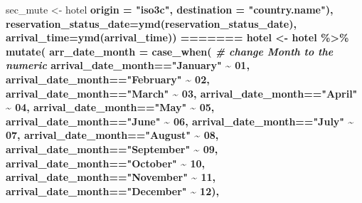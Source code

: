 \documentclass[11pt,a4paper,]{article}
\newenvironment{Shaded}{\begin{snugshade}}{\end{snugshade}}
\newcommand{\CommentTok}[1]{\textcolor[rgb]{0.56,0.35,0.01}{\textit{#1}}}
\newcommand{\DataTypeTok}[1]{\textcolor[rgb]{0.13,0.29,0.53}{#1}}
\newcommand{\DecValTok}[1]{\textcolor[rgb]{0.00,0.00,0.81}{#1}}
\newcommand{\KeywordTok}[1]{\textcolor[rgb]{0.13,0.29,0.53}{\textbf{#1}}}
\newcommand{\NormalTok}[1]{#1}
\newcommand{\OperatorTok}[1]{\textcolor[rgb]{0.81,0.36,0.00}{\textbf{#1}}}
\newcommand{\StringTok}[1]{\textcolor[rgb]{0.31,0.60,0.02}{#1}}
\begin{document}
\begin{Shaded}
\begin{Highlighting}[]
{\NormalTok{  sec_mute <-}\StringTok{ }\NormalTok{hotel }\OperatorTok{%
                                      \DataTypeTok{origin =} \StringTok{"iso3c"}\NormalTok{,}
                                      \DataTypeTok{destination =} \StringTok{"country.name"}\NormalTok{),}
          \DataTypeTok{reservation_status_date=}\KeywordTok{ymd}\NormalTok{(reservation_status_date),}
         \DataTypeTok{arrival_time=}\KeywordTok{ymd}\NormalTok{(arrival_time)) }
=======
\NormalTok{hotel \textless{}{-}}\StringTok{ }\NormalTok{hotel }\OperatorTok{\%\textgreater{}\%}\StringTok{ }\KeywordTok{mutate}\NormalTok{(}
    \DataTypeTok{arr\_date\_month =} \KeywordTok{case\_when}\NormalTok{(   }\CommentTok{\# change Month to the numeric }
\NormalTok{    arrival\_date\_month}\OperatorTok{==}\StringTok{"January"} \OperatorTok{\textasciitilde{}}\StringTok{ }\DecValTok{01}\NormalTok{,}
\NormalTok{    arrival\_date\_month}\OperatorTok{==}\StringTok{"February"} \OperatorTok{\textasciitilde{}}\StringTok{ }\DecValTok{02}\NormalTok{,}
\NormalTok{    arrival\_date\_month}\OperatorTok{==}\StringTok{"March"} \OperatorTok{\textasciitilde{}}\StringTok{ }\DecValTok{03}\NormalTok{,}
\NormalTok{    arrival\_date\_month}\OperatorTok{==}\StringTok{"April"} \OperatorTok{\textasciitilde{}}\StringTok{ }\DecValTok{04}\NormalTok{,}
\NormalTok{    arrival\_date\_month}\OperatorTok{==}\StringTok{"May"} \OperatorTok{\textasciitilde{}}\StringTok{ }\DecValTok{05}\NormalTok{,}
\NormalTok{    arrival\_date\_month}\OperatorTok{==}\StringTok{"June"} \OperatorTok{\textasciitilde{}}\StringTok{ }\DecValTok{06}\NormalTok{,}
\NormalTok{    arrival\_date\_month}\OperatorTok{==}\StringTok{"July"} \OperatorTok{\textasciitilde{}}\StringTok{ }\DecValTok{07}\NormalTok{,}
\NormalTok{    arrival\_date\_month}\OperatorTok{==}\StringTok{"August"} \OperatorTok{\textasciitilde{}}\StringTok{ }\DecValTok{08}\NormalTok{,}
\NormalTok{    arrival\_date\_month}\OperatorTok{==}\StringTok{"September"} \OperatorTok{\textasciitilde{}}\StringTok{ }\DecValTok{09}\NormalTok{,}
\NormalTok{    arrival\_date\_month}\OperatorTok{==}\StringTok{"October"} \OperatorTok{\textasciitilde{}}\StringTok{ }\DecValTok{10}\NormalTok{,}
\NormalTok{    arrival\_date\_month}\OperatorTok{==}\StringTok{"November"} \OperatorTok{\textasciitilde{}}\StringTok{ }\DecValTok{11}\NormalTok{,}
\NormalTok{    arrival\_date\_month}\OperatorTok{==}\StringTok{"December"} \OperatorTok{\textasciitilde{}}\StringTok{ }\DecValTok{12}\NormalTok{),}
}}
\end{Highlighting}
\end{Shaded}
\end{document}
